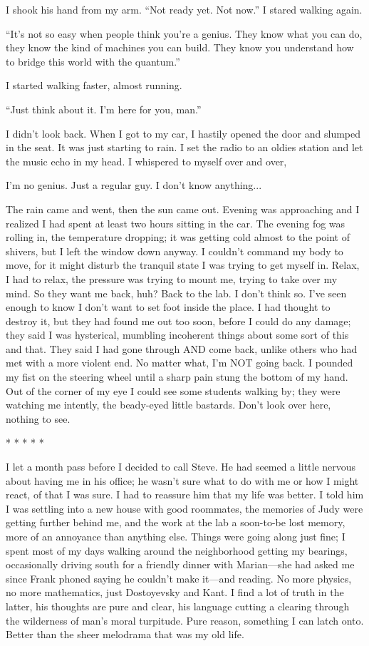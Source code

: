 I shook his hand from my arm. ``Not ready yet. Not now.'' I stared
walking again.

``It's not so easy when people think you're a genius. They know what you
can do, they know the kind of machines you can build. They know you
understand how to bridge this world with the quantum.''

I started walking faster, almost running.

``Just think about it. I'm here for you, man.''

I didn't look back. When I got to my car, I hastily opened the door and
slumped in the seat. It was just starting to rain. I set the radio to an
oldies station and let the music echo in my head. I whispered to myself
over and over,

I'm no genius. Just a regular guy. I don't know anything...

The rain came and went, then the sun came out. Evening was approaching
and I realized I had spent at least two hours sitting in the car. The
evening fog was rolling in, the temperature dropping; it was getting
cold almost to the point of shivers, but I left the window down anyway.
I couldn't command my body to move, for it might disturb the tranquil
state I was trying to get myself in. Relax, I had to relax, the pressure
was trying to mount me, trying to take over my mind. So they want me
back, huh? Back to the lab. I don't think so. I've seen enough to know I
don't want to set foot inside the place. I had thought to destroy it,
but they had found me out too soon, before I could do any damage; they
said I was hysterical, mumbling incoherent things about some sort of
this and that. They said I had gone through AND come back, unlike others
who had met with a more violent end. No matter what, I'm NOT going back.
I pounded my fist on the steering wheel until a sharp pain stung the
bottom of my hand. Out of the corner of my eye I could see some students
walking by; they were watching me intently, the beady-eyed little
bastards. Don't look over here, nothing to see.

* * * * *

I let a month pass before I decided to call Steve. He had seemed a
little nervous about having me in his office; he wasn't sure what to do
with me or how I might react, of that I was sure. I had to reassure him
that my life was better. I told him I was settling into a new house with
good roommates, the memories of Judy were getting further behind me, and
the work at the lab a soon-to-be lost memory, more of an annoyance than
anything else. Things were going along just fine; I spent most of my
days walking around the neighborhood getting my bearings, occasionally
driving south for a friendly dinner with Marian---she had asked me since
Frank phoned saying he couldn't make it---and reading. No more physics,
no more mathematics, just Dostoyevsky and Kant. I find a lot of truth in
the latter, his thoughts are pure and clear, his language cutting a
clearing through the wilderness of man's moral turpitude. Pure reason,
something I can latch onto. Better than the sheer melodrama that was my
old life.

